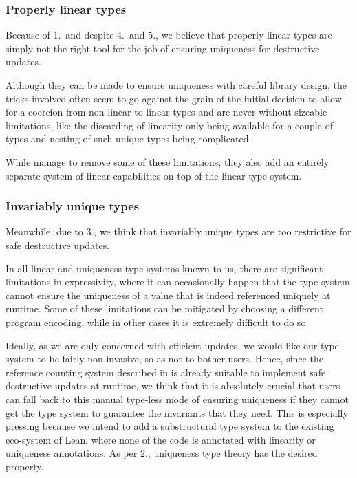 \subsubsection{Properly linear types}
Because of 1.\ and despite 4.\ and 5., we believe that properly linear types are simply not the right tool for the job of ensuring uniqueness for destructive updates. 

Although they can be made to ensure uniqueness with careful library design, the tricks involved often seem to go against the grain of the initial decision to allow for a coercion from non-linear to linear types and are never without sizeable limitations, like the discarding of linearity only being available for a couple of types and nesting of such unique types being complicated. 

While \cite{spiwack_linearly_2022} manage to remove some of these limitations, they also add an entirely separate system of linear capabilities on top of the linear type system.

\subsubsection{Invariably unique types}
Meanwhile, due to 3., we think that invariably unique types are too restrictive for safe destructive updates. 

In all linear and uniqueness type systems known to us, there are significant limitations in expressivity, where it can occasionally happen that the type system cannot ensure the uniqueness of a value that is indeed referenced uniquely at runtime. Some of these limitations can be mitigated by choosing a different program encoding, while in other cases it is extremely difficult to do so. 

Ideally, as we are only concerned with efficient updates, we would like our type system to be fairly non-invasive, so as not to bother users. Hence, since the reference counting system described in  is already suitable to implement safe destructive updates at runtime, we think that it is absolutely crucial that users can fall back to this manual type-less mode of ensuring uniqueness if they cannot get the type system to guarantee the invariants that they need. This is especially pressing because we intend to add a substructural type system to the existing eco-system of Lean, where none of the code is annotated with linearity or uniqueness annotations. As per 2., uniqueness type theory has the desired property.

